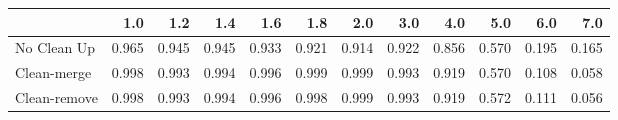\begin{tabular}{lrrrrrrrrrrr}
\toprule
{} &   1.0 &   1.2 &   1.4 &   1.6 &   1.8 &   2.0 &   3.0 &   4.0 &   5.0 &   6.0 &   7.0 \\
\midrule
No Clean Up  & 0.965 & 0.945 & 0.945 & 0.933 & 0.921 & 0.914 & 0.922 & 0.856 & 0.570 & 0.195 & 0.165 \\
Clean-merge  & 0.998 & 0.993 & 0.994 & 0.996 & 0.999 & 0.999 & 0.993 & 0.919 & 0.570 & 0.108 & 0.058 \\
Clean-remove & 0.998 & 0.993 & 0.994 & 0.996 & 0.998 & 0.999 & 0.993 & 0.919 & 0.572 & 0.111 & 0.056 \\
\bottomrule
\end{tabular}

